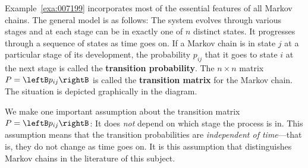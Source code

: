 \begin{wrapfigure}[13]{l}{5cm}
\centering

\end{wrapfigure}

Example~\ref{exa:007199} incorporates most of the essential features of all Markov chains. The general model is as follows: The system evolves through various stages and at each stage can be in exactly one of $n$ distinct states. It progresses through a sequence of states as time goes on. If a Markov chain is in state $j$ at a particular stage of its development, the probability $p_{ij}$ that it goes to state $i$ at the next stage is called the \textbf{transition probability}. The $n \times n$ matrix $P = \leftB p_{ij} \rightB$ is called the \textbf{transition matrix} for the Markov chain. The situation is depicted graphically in the diagram.


We make one important assumption about the transition matrix $P = \leftB p_{ij} \rightB$: It does \textit{not} depend on which stage the process is in. This assumption means that the transition probabilities are \textit{independent of time}---that is, they do not change as time goes on. It is this assumption that distinguishes Markov chains in the literature of this subject.

